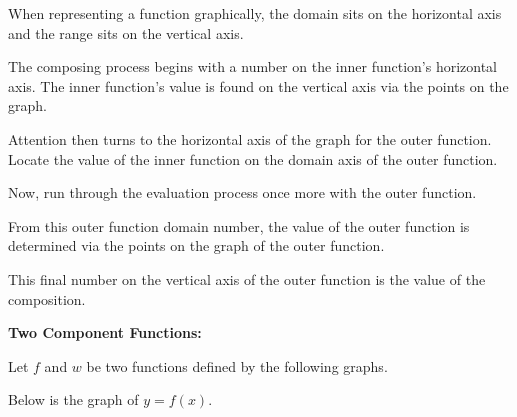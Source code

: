 \documentclass{ximera}
\begin{document}
When representing a function graphically, the domain sits on the horizontal axis and the range sits on the vertical axis.

The composing process begins with a number on the inner function's horizontal axis. The inner function's value is found on the vertical axis via the points on the graph.

Attention then turns to the horizontal axis of the graph for the outer function. Locate the value of the inner function on the domain axis of the outer function.

Now, run through the evaluation process once more with the outer function.

From this outer function domain number, the value of the outer function is determined via the points on the graph of the outer function.

This final number on the vertical axis of the outer function is the value of the composition.



\textbf{Two Component Functions:}


Let $f$ and $w$ be two functions defined by the following graphs.



Below is the graph of $y=f(x)$.  

\begin{image}
\end{image}
\end{document}
